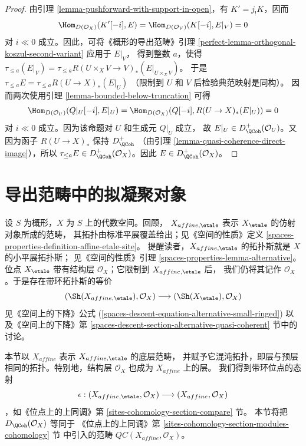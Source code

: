 \begin{proof}
\medskip\noindent
由引理 \ref{lemma-pushforward-with-support-in-open}，有
$K' =  j_!K$，因而
$$
\Hom_{D(\mathcal{O}_X)}(K'[-i], E) = \Hom_{D(\mathcal{O}_V)}(K[-i], E|_V) = 0
$$
对 $i \ll 0$ 成立。因此，可将《概形的导出范畴》引理
\ref{perfect-lemma-orthogonal-koszul-second-variant} 应用于 $E|_V$，
得到整数 $a$，使得
$\tau_{\leq a}(E|_V) =
\tau_{\leq a} R (U \times_X V \to V)_* (E|_{U \times_X V})$。
于是 $\tau_{\leq a} E = \tau_{\leq a} R (U \to X)_* (E |_U)$
（限制到 $U$ 和 $V$ 后检验典范映射是同构）。
因而两次使用引理 \ref{lemma-bounded-below-truncation} 可得
$$
\Hom_{D(\mathcal{O}_U)}(Q|_U [-i], E|_U) =
\Hom_{D(\mathcal{O}_X)}(Q[-i], R (U \to X)_* (E|_U)) = 0
$$
对 $i \ll 0$ 成立。因为该命题对 $U$ 和生成元 $Q|_U$ 成立，
故 $E|_U \in D^+_\QCoh(\mathcal{O}_U)$。又因为函子
$R (U \to X)_*$ 保持 $D^+_\QCoh$
（由引理 \ref{lemma-quasi-coherence-direct-image}），所以
$\tau_{\leq a}E \in D^+_\QCoh(\mathcal{O}_X)$。因此
$E \in D^+_\QCoh (\mathcal{O}_X)$。
\end{proof}











\section{导出范畴中的拟凝聚对象}
\label{section-QC}

\noindent
设 $S$ 为概形，$X$ 为 $S$ 上的代数空间。回顾，
$X_{affine, \etale}$ 表示 $X_\etale$ 的仿射对象所成的范畴，
其拓扑由标准平展覆盖给出；见《空间的性质》定义
\ref{spaces-properties-definition-affine-etale-site}。
提醒读者，$X_{affine, \etale}$ 的拓扑斯就是 $X$ 的小平展拓扑斯；
见《空间的性质》引理
\ref{spaces-properties-lemma-alternative}。位点 $X_\etale$
带有结构层 $\mathcal{O}_X$；它限制到 $X_{affine, \etale}$ 后，
我们仍将其记作 $\mathcal{O}_X$。于是存在带环拓扑斯的等价
$$
(\Sh(X_{affine, \etale}), \mathcal{O}_X)
\longrightarrow
(\Sh(X_\etale), \mathcal{O}_X)
$$
见《空间上的下降》公式
(\ref{spaces-descent-equation-alternative-small-ringed})
以及《空间上的下降》第
\ref{spaces-descent-section-alternative-quasi-coherent} 节中的讨论。

\medskip\noindent
本节以 $X_{affine}$ 表示 $X_{affine, \etale}$ 的底层范畴，
并赋予它混沌拓扑，即层与预层相同的拓扑。特别地，结构层
$\mathcal{O}_X$ 也成为 $X_{affine}$ 上的层。
我们得到带环位点的态射 %
$$
\epsilon :
(X_{affine, \etale}, \mathcal{O}_X)
\longrightarrow
(X_{affine}, \mathcal{O}_X)
$$
，如《位点上的上同调》第 \ref{sites-cohomology-section-compare} 节。
本节将把 $D_\QCoh(\mathcal{O}_X)$ 等同于
《位点上的上同调》第 \ref{sites-cohomology-section-modules-cohomology} 节
中引入的范畴 $\mathit{QC}(X_{affine}, \mathcal{O}_X)$。

